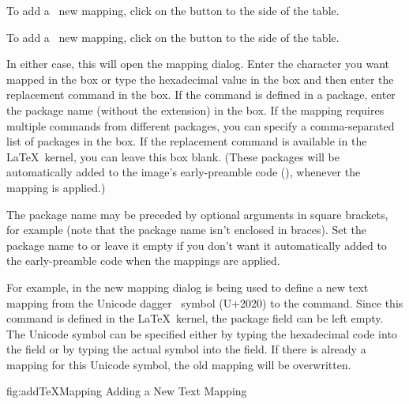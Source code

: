 To add a \textmode\ new mapping, \gls{click} on the
 button to the
side of the  table. 

To add a \mathsmode\ new mapping, \gls{click} on the
 button to the
side of the  table. 


In either case, this will open the  mapping
dialog. Enter the character you want mapped in the
 box or type the hexadecimal value in the
 box and then enter the replacement
command in the  box.  If the command is
defined in a package, enter the package name (without the 
extension) in the  box. If the mapping
requires multiple commands from different packages, you can specify
a comma-separated list of packages in the
 box. If the replacement command is
available in the \LaTeX\ kernel, you can leave this box blank.
(These packages will be automatically added to the
image's \gls{early-preamble} code (), whenever the
mapping is applied.)

The package name may be preceded by optional arguments in square
brackets, for example  (note that the package name
isn't enclosed in braces). Set the package name to  or
leave it empty if you don't want it automatically added to the
\gls{early-preamble} code when the mappings are applied.

For example, in  the new mapping dialog
is being used to define a new text mapping from the Unicode dagger
\textdagger\ symbol (U+2020) to the  command.
Since this command is defined in the \LaTeX\ kernel, the package
field can be left empty. The Unicode symbol can be specified either
by typing the hexadecimal code into the
 field or by typing the actual
symbol into the  field. If there
is already a mapping for this Unicode symbol, the old mapping will
be overwritten.

\FloatFig
  {fig:addTeXMapping}
  {}
  {Adding a New Text Mapping} 

